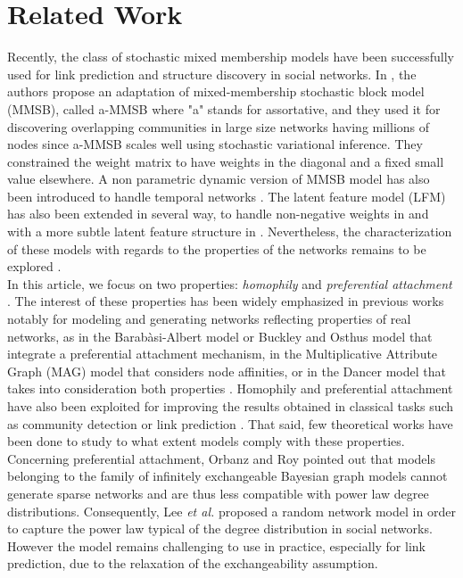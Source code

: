 \documentclass[conference]{IEEEtran}
\begin{document}
\section{Related Work}
\label{sec:rel-work}

Recently,  the class of stochastic mixed membership models have been successfully used for link prediction and structure discovery in social networks.  In \cite{AMMSB}, the authors  propose an adaptation of mixed-membership stochastic block model (MMSB), called a-MMSB where "a" stands for assortative, and they used it for discovering overlapping communities in large size networks having millions of nodes since a-MMSB  scales well using stochastic variational inference. They constrained the weight matrix to have weights in the diagonal and a fixed small value elsewhere. A non parametric dynamic version of MMSB model has also been introduced to  handle temporal networks \cite{fan2015dynamic}. The latent feature model (LFM) has also been extended in several way, to handle non-negative weights in \cite{IMRM} and with a more subtle latent feature structure in \cite{ILAM}. Nevertheless, the characterization of these models with regards to the properties of the networks remains to be explored \cite{jacobs2014unified}. ~\\

In this article, we focus on two properties:  \textit{homophily} and \textit{preferential attachment} \cite{Newman2010, Barabasi2003}. The interest of these properties has been widely emphasized in previous works notably for modeling and generating networks reflecting properties of real networks, as in the Barab\`asi-Albert model \cite{albert2002statistical} or Buckley and Osthus model \cite{Buckley2001} that integrate a preferential attachment mechanism, in the Multiplicative Attribute Graph (MAG) model \cite{Kim2012} that considers node affinities, or in the Dancer model that takes into consideration both properties \cite{Largeron2017}. Homophily and preferential attachment have also  been exploited for improving the results obtained in classical tasks such as community detection \cite{Ciglan2013,Zhang2016} or link prediction \cite{Aiello2012,Zeng2016}. That said, few theoretical works have been done to study to what extent models comply with these properties. ~\\

Concerning preferential attachment, Orbanz and Roy \cite{orbanz2015bayesian} pointed out that models belonging to the family of infinitely exchangeable Bayesian graph models cannot generate sparse networks and are thus less compatible with power law degree distributions. Consequently, Lee \textit{et al.} \cite{Lee2015} proposed a random network model in order to capture the power law typical of the degree distribution in social networks. However the model remains challenging to use in practice, especially for link prediction, due to the relaxation of the exchangeability assumption.~\\
\end{document}
